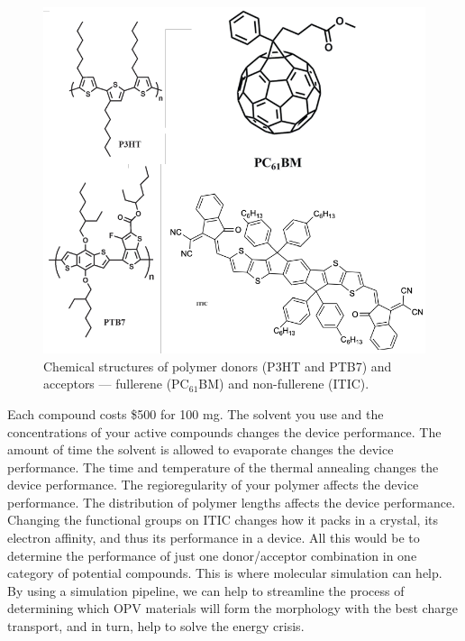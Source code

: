 \begin{figure}
    \centering
    \includegraphics[width=\linewidth]{images/chem_structures.pdf}
    \caption{Chemical structures of polymer donors (P3HT and PTB7) and acceptors --- fullerene (PC$_{61}$BM) and non-fullerene (ITIC).}\label{chemistries}
\end{figure}
\noindent Each compound costs \$500 for 100 mg\cite{sigmaaldrich}.
The solvent you use and the concentrations of your active compounds changes the device performance\cite{Hoppe2004a}.
The amount of time the solvent is allowed to evaporate changes the device performance\cite{Li2007}.
The time and temperature of the thermal annealing changes the device performance\cite{Ma2005}.
The regioregularity of your polymer affects the device performance\cite{Kim2006}.
The distribution of polymer lengths affects the device performance\cite{Zhao2013b}.
Changing the functional groups on ITIC changes how it packs in a crystal, its electron affinity, and thus its performance in a device\cite{Swick2019a}.
All this would be to determine the performance of just one donor/acceptor combination in one category of potential compounds\cite{Dou2013}.
This is where molecular simulation can help.
By using a simulation pipeline, we can help to streamline the process of determining which OPV materials will form the morphology with the best charge transport, and in turn, help to solve the energy crisis.

